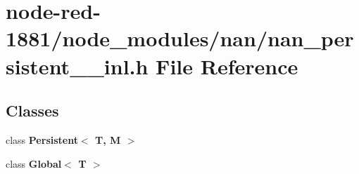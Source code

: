 \section{node-\/red-\/1881/node\+\_\+modules/nan/nan\+\_\+persistent\+\_\+\_\+inl.h File Reference}
\label{nan__persistent__12__inl_8h}
\subsection*{Classes}
\begin{DoxyCompactItemize}
\item 
class \textbf{ Persistent$<$ T, M $>$}
\item 
class \textbf{ Global$<$ T $>$}
\end{DoxyCompactItemize}

